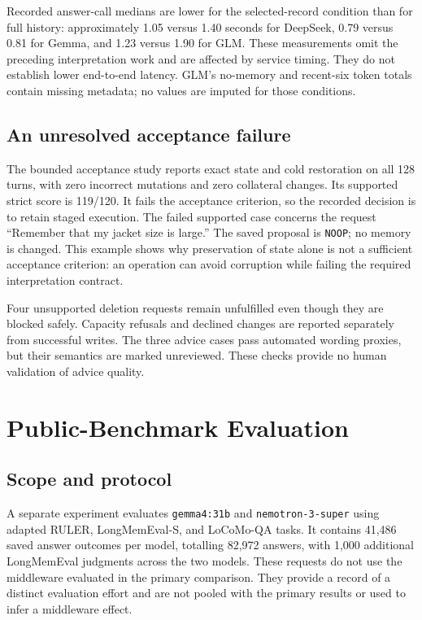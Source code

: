 \documentclass[11pt,a4paper]{article}
\begin{document}
Recorded answer-call medians are lower for the selected-record condition than for full history: approximately 1.05 versus 1.40 seconds for DeepSeek, 0.79 versus 0.81 for Gemma, and 1.23 versus 1.90 for GLM. These measurements omit the preceding interpretation work and are affected by service timing. They do not establish lower end-to-end latency. GLM's no-memory and recent-six token totals contain missing metadata; no values are imputed for those conditions.

\subsection{An unresolved acceptance failure}
The bounded acceptance study reports exact state and cold restoration on all 128 turns, with zero incorrect mutations and zero collateral changes. Its supported strict score is 119/120. It fails the acceptance criterion, so the recorded decision is to retain staged execution. The failed supported case concerns the request ``Remember that my jacket size is large.'' The saved proposal is \texttt{NOOP}; no memory is changed. This example shows why preservation of state alone is not a sufficient acceptance criterion: an operation can avoid corruption while failing the required interpretation contract.

Four unsupported deletion requests remain unfulfilled even though they are blocked safely. Capacity refusals and declined changes are reported separately from successful writes. The three advice cases pass automated wording proxies, but their semantics are marked unreviewed. These checks provide no human validation of advice quality.

\section{Public-Benchmark Evaluation}\label{sec:public}
\subsection{Scope and protocol}
A separate experiment evaluates \texttt{gemma4:31b} and \texttt{nemotron-3-super} using adapted RULER, LongMemEval-S, and LoCoMo-QA tasks. It contains 41,486 saved answer outcomes per model, totalling 82,972 answers, with 1,000 additional LongMemEval judgments across the two models. These requests do not use the middleware evaluated in the primary comparison. They provide a record of a distinct evaluation effort and are not pooled with the primary results or used to infer a middleware effect.
\end{document}
